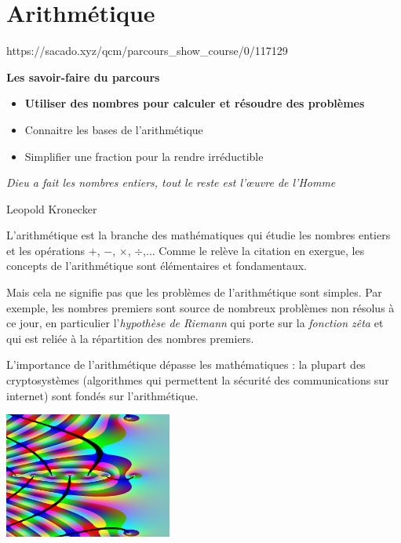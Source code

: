 \chapter{Arithmétique}
{https://sacado.xyz/qcm/parcours_show_course/0/117129}
{


 \begin{CpsCol}
\textbf{Les savoir-faire du parcours}
 \begin{itemize}
 \item \textbf{Utiliser des nombres pour calculer et résoudre des problèmes}
 \item Connaitre les bases de l'arithmétique
 \item Simplifier une fraction pour la rendre irréductible
 \end{itemize}
 \end{CpsCol}

 \begin{His}
   
  \hfill{\em Dieu a fait les nombres entiers, tout le reste est l'œuvre de l'Homme}

  \hfill{Leopold Kronecker}

     \bigskip

     
\begin{minipage}[b]{0.6\textwidth}{L'arithmétique est la branche des mathématiques qui étudie
  les nombres entiers et les opérations $+$, $-$, $\times$, $\div$,...
  Comme le relève la citation en exergue, les concepts de l'arithmétique
  sont élémentaires et fondamentaux.

  Mais cela ne signifie pas que
  les problèmes de l'arithmétique sont simples. Par exemple,
  les nombres premiers sont source de nombreux problèmes
  non résolus à ce jour, en particulier l'{\em hypothèse de Riemann}
  qui porte sur la {\em fonction zêta} et qui est reliée à la
  répartition des nombres premiers.

  L'importance de l'arithmétique dépasse les mathématiques : la plupart des
  cryptosystèmes (algorithmes qui permettent la sécurité des
  communications sur internet) sont fondés sur l'arithmétique.
  }
\end{minipage}
\begin{minipage}[b]{0.4\textwidth}
\begin{center}    
  \includegraphics[width=5.5cm]{FIG/zeta7b.png}


\end{center}
\end{minipage}
\end{His}}
